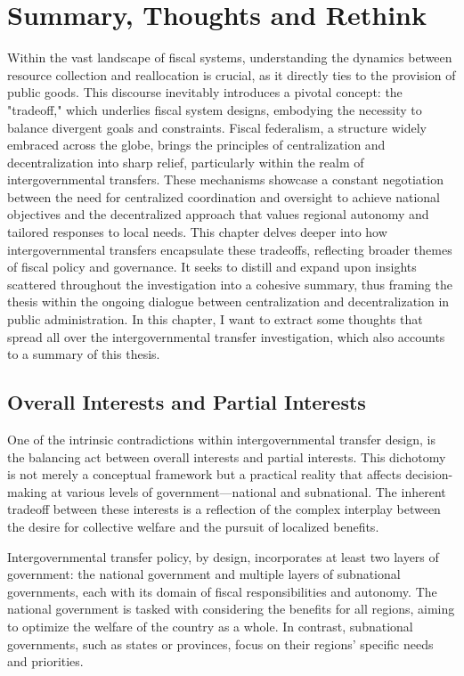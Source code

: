 \chapter{Summary, Thoughts and Rethink}

Within the vast landscape of fiscal systems, understanding the dynamics between resource collection and reallocation is crucial, as it directly ties to the provision of public goods. This discourse inevitably introduces a pivotal concept: the "tradeoff," which underlies fiscal system designs, embodying the necessity to balance divergent goals and constraints. Fiscal federalism, a structure widely embraced across the globe, brings the principles of centralization and decentralization into sharp relief, particularly within the realm of intergovernmental transfers. These mechanisms showcase a constant negotiation between the need for centralized coordination and oversight to achieve national objectives and the decentralized approach that values regional autonomy and tailored responses to local needs. This chapter delves deeper into how intergovernmental transfers encapsulate these tradeoffs, reflecting broader themes of fiscal policy and governance. It seeks to distill and expand upon insights scattered throughout the investigation into a cohesive summary, thus framing the thesis within the ongoing dialogue between centralization and decentralization in public administration. In this chapter, I want to extract some thoughts that spread all over the intergovernmental transfer investigation, which also accounts to a summary of this thesis.

\section{Overall Interests and Partial Interests}

One of the intrinsic contradictions within intergovernmental transfer design, is the balancing act between overall interests and partial interests. This dichotomy is not merely a conceptual framework but a practical reality that affects decision-making at various levels of government—national and subnational. The inherent tradeoff between these interests is a reflection of the complex interplay between the desire for collective welfare and the pursuit of localized benefits.

Intergovernmental transfer policy, by design, incorporates at least two layers of government: the national government and multiple layers of subnational governments, each with its domain of fiscal responsibilities and autonomy. The national government is tasked with considering the benefits for all regions, aiming to optimize the welfare of the country as a whole. In contrast, subnational governments, such as states or provinces, focus on their regions' specific needs and priorities.

